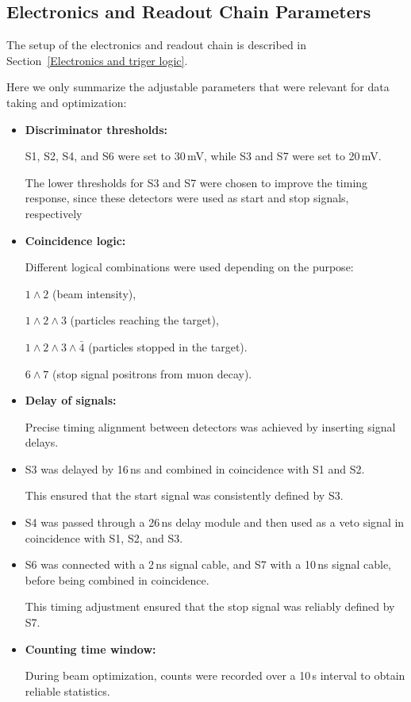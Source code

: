 \documentclass[11pt,a4paper]{article}
\begin{document}
\subsection{Electronics and Readout Chain Parameters}

The setup of the electronics and readout chain is described in Section~\ref{Electronics and triger logic}.

Here we only summarize the adjustable parameters that were relevant for data taking and optimization:

\begin{itemize}

\item \textbf{Discriminator thresholds:}

S1, S2, S4, and S6 were set to 30\,mV, while S3 and S7 were set to 20\,mV.

The lower thresholds for S3 and S7 were chosen to improve the timing response, since these detectors were used as start and stop signals, respectively

\item \textbf{Coincidence logic:}

Different logical combinations were used depending on the purpose:

$1 \land 2$ (beam intensity),

$1 \land 2 \land 3$ (particles reaching the target),

$1 \land 2 \land 3 \land \bar{4}$ (particles stopped in the target).

$6\land 7$  (stop signal positrons from muon decay).

\item \textbf{Delay of signals:}

Precise timing alignment between detectors was achieved by inserting signal delays.

\end{itemize}

\begin{itemize}
\item S3 was delayed by 16\,ns and combined in coincidence with S1 and S2.

This ensured that the start signal was consistently defined by S3.

\item S4 was passed through a 26\,ns delay module and then used as a veto signal in coincidence with S1, S2, and S3.

\item S6 was connected with a 2\,ns signal cable, and S7 with a 10\,ns signal cable, before being combined in coincidence.

This timing adjustment ensured that the stop signal was reliably defined by S7.

\item \textbf{Counting time window:}

During beam optimization, counts were recorded over a 10\,s interval to obtain reliable statistics.

\end{itemize}
\end{document}
